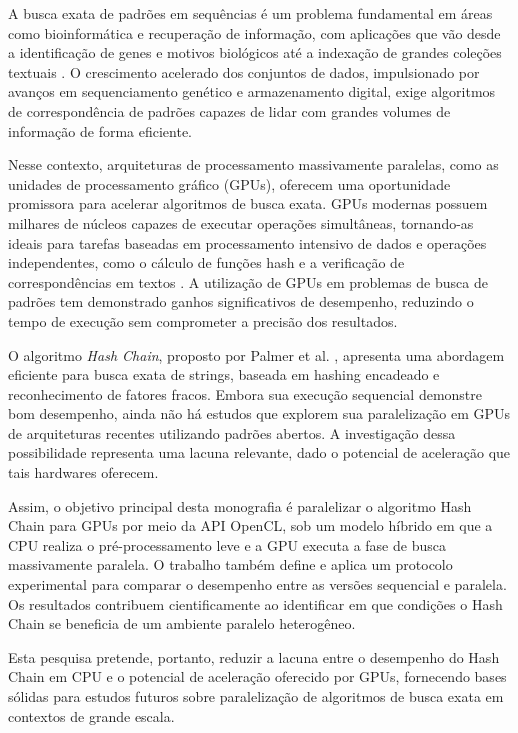 \documentclass[12pt]{article}
\begin{document}
A busca exata de padrões em sequências é um problema fundamental em áreas como bioinformática e recuperação de informação, com aplicações que vão desde a identificação de genes e motivos biológicos até a indexação de grandes coleções textuais \cite{gusfield1997,navarro2001}. O crescimento acelerado dos conjuntos de dados, impulsionado por avanços em sequenciamento genético e armazenamento digital, exige algoritmos de correspondência de padrões capazes de lidar com grandes volumes de informação de forma eficiente.

Nesse contexto, arquiteturas de processamento massivamente paralelas, como as unidades de processamento gráfico (GPUs), oferecem uma oportunidade promissora para acelerar algoritmos de busca exata. GPUs modernas possuem milhares de núcleos capazes de executar operações simultâneas, tornando-as ideais para tarefas baseadas em processamento intensivo de dados e operações independentes, como o cálculo de funções hash e a verificação de correspondências em textos \cite{ashkiani2016}. A utilização de GPUs em problemas de busca de padrões tem demonstrado ganhos significativos de desempenho, reduzindo o tempo de execução sem comprometer a precisão dos resultados.

O algoritmo \textit{Hash Chain}, proposto por Palmer et al. \cite{palmer2024}, apresenta uma abordagem eficiente para busca exata de strings, baseada em hashing encadeado e reconhecimento de fatores fracos. Embora sua execução sequencial demonstre bom desempenho, ainda não há estudos que explorem sua paralelização em GPUs de arquiteturas recentes utilizando padrões abertos. A investigação dessa possibilidade representa uma lacuna relevante, dado o potencial de aceleração que tais hardwares oferecem.

Assim, o objetivo principal desta monografia é paralelizar o algoritmo Hash Chain para GPUs por meio da API OpenCL, sob um modelo híbrido em que a CPU realiza o pré-processamento leve e a GPU executa a fase de busca massivamente paralela. O trabalho também define e aplica um protocolo experimental para comparar o desempenho entre as versões sequencial e paralela. Os resultados contribuem cientificamente ao identificar em que condições o Hash Chain se beneficia de um ambiente paralelo heterogêneo.

Esta pesquisa pretende, portanto, reduzir a lacuna entre o desempenho do Hash Chain em CPU e o potencial de aceleração oferecido por GPUs, fornecendo bases sólidas para estudos futuros sobre paralelização de algoritmos de busca exata em contextos de grande escala.
\end{document}
